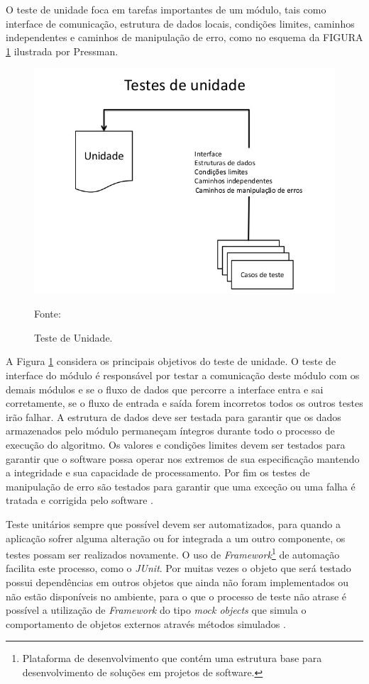 O teste de unidade foca em tarefas importantes de um módulo, tais como interface de comunicação, estrutura de dados locais, condições limites, caminhos independentes e caminhos de manipulação de erro, como no esquema da FIGURA \ref{unidade} ilustrada por Pressman.

\begin{figure}[H]
	\centering
	\includegraphics[scale=0.5]{dados/figuras/testeDeUnidade.jpg}
	\caption{Teste de Unidade.}
	Fonte: \cite[p.~474]{PRESMA2016}
	\label{unidade}
\end{figure}

A Figura \ref{unidade} considera os principais objetivos do teste de unidade. O teste de interface do módulo é responsável por testar a comunicação deste módulo com os demais módulos e se o fluxo de dados que percorre a interface entra e sai corretamente, se o fluxo de entrada e saída forem incorretos todos os outros testes irão falhar. A estrutura de dados deve ser testada para garantir que os dados armazenados pelo módulo permaneçam íntegros durante todo o processo de execução do algoritmo. Os valores e condições limites devem ser testados para garantir que o software possa operar nos extremos de sua especificação mantendo a integridade e sua capacidade de processamento. Por fim os testes de manipulação de erro são testados para garantir que uma exceção ou uma falha é tratada e corrigida pelo software \cite{PRESMA2016}.

Teste unitários sempre que possível devem ser automatizados, para quando a aplicação sofrer alguma alteração ou for integrada a um outro componente, os testes possam ser realizados novamente. O uso de \textit{Framework}\footnote{Plataforma de desenvolvimento que contém uma estrutura base para desenvolvimento de soluções em projetos de software.} de automação facilita este processo, como o \textit{JUnit}. Por muitas vezes o objeto que será testado possui dependências em outros objetos que ainda não foram implementados ou não estão disponíveis no ambiente, para o que o processo de teste não atrase é possível a utilização de \textit{Framework} do tipo \textit{mock objects} que simula o comportamento de objetos externos através métodos simulados \cite{SOMMER2011}. 



